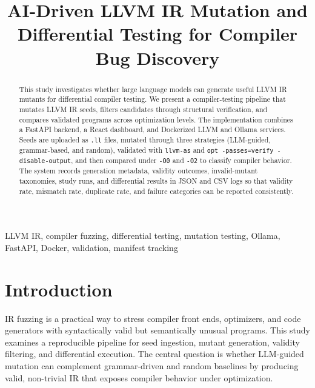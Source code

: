 \documentclass[journal]{IEEEtran}
\begin{document}
\title{AI-Driven LLVM IR Mutation and Differential Testing for Compiler Bug Discovery}
\author{
}

\maketitle

\begin{abstract}
This study investigates whether large language models can generate useful LLVM IR mutants for differential compiler testing. We present a compiler-testing pipeline that mutates LLVM IR seeds, filters candidates through structural verification, and compares validated programs across optimization levels. The implementation combines a FastAPI backend, a React dashboard, and Dockerized LLVM and Ollama services. Seeds are uploaded as \texttt{.ll} files, mutated through three strategies (LLM-guided, grammar-based, and random), validated with \texttt{llvm-as} and \texttt{opt -passes=verify -disable-output}, and then compared under \texttt{-O0} and \texttt{-O2} to classify compiler behavior. The system records generation metadata, validity outcomes, invalid-mutant taxonomies, study runs, and differential results in JSON and CSV logs so that validity rate, mismatch rate, duplicate rate, and failure categories can be reported consistently.
\end{abstract}

\begin{IEEEkeywords}
LLVM IR, compiler fuzzing, differential testing, mutation testing, Ollama, FastAPI, Docker, validation, manifest tracking
\end{IEEEkeywords}

\section{Introduction}

 IR fuzzing is a practical way to stress compiler front ends, optimizers, and code generators with syntactically valid but semantically unusual programs. This study examines a reproducible pipeline for seed ingestion, mutant generation, validity filtering, and differential execution. The central question is whether LLM-guided mutation can complement grammar-driven and random baselines by producing valid, non-trivial IR that exposes compiler behavior under optimization.
\end{document}
